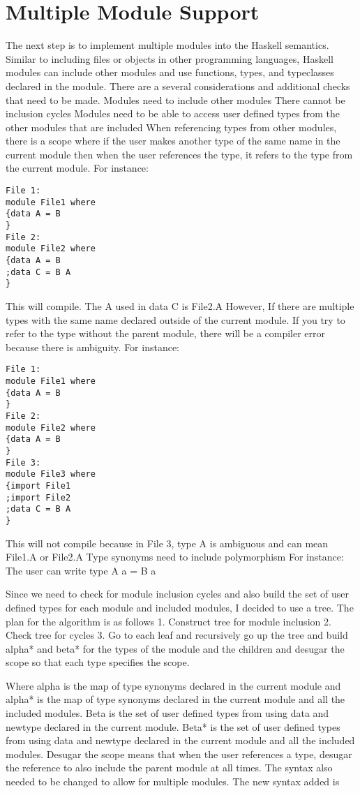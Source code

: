 \chapter{Multiple Module Support}
The next step is to implement multiple modules into the Haskell semantics. Similar to including files or objects in other programming languages, Haskell modules can include other modules and use functions, types, and typeclasses declared in the module.
There are a several considerations and additional checks that need to be made.
Modules need to include other modules
There cannot be inclusion cycles
Modules need to be able to access user defined types from the other modules that are included
When referencing types from other modules, there is a scope where
if the user makes another type of the same name in the current module
then when the user references the type, it refers to the type from the current module.
For instance:
\begin{lstlisting}
File 1:
module File1 where
{data A = B
}
File 2:
module File2 where
{data A = B
;data C = B A
}
\end{lstlisting}
	This will compile. The A used in data C is File2.A
However, If there are multiple types with the same name declared outside of the current module. If you try to refer to the type without the parent module, there will be a compiler error because there is ambiguity.
For instance:
\begin{lstlisting}
File 1:
module File1 where
{data A = B
}
File 2:
module File2 where
{data A = B
}
File 3:
module File3 where
{import File1
;import File2
;data C = B A
}
\end{lstlisting}

	This will not compile because in File 3, type A is ambiguous and can mean File1.A or File2.A
Type synonyms need to include polymorphism
For instance:
	The user can write
	type A a = B a

Since we need to check for module inclusion cycles and also build the set of user defined types for each module and included modules, I decided to use a tree.
The plan for the algorithm is as follows
1. Construct tree for module inclusion
2. Check tree for cycles
3. Go to each leaf and recursively go up the tree and build alpha* and beta* for the types of the module and the children and desugar the scope so that each type specifies the scope.

Where alpha is the map of type synonyms declared in the current module and alpha* is the map of type synonyms declared in the current module and all the included modules. Beta is the set of user defined types from using data and newtype declared in the current module. Beta* is the set of user defined types from using data and newtype declared in the current module and all the included modules. 
Desugar the scope means that when the user references a type, desugar the reference to also include the parent module at all times.
The syntax also needed to be changed to allow for multiple modules. The new syntax added is

